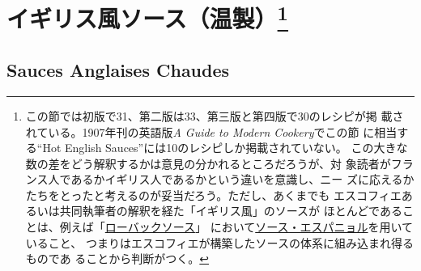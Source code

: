 \hypertarget{ux30a4ux30aeux30eaux30b9ux98a8ux30bdux30fcux30b9ux6e29ux88fd24}{%
\section[イギリス風ソース（温製）]{\texorpdfstring{イギリス風ソース（温製）\footnote{この節では初版で31、第二版は33、第三版と第四版で30のレシピが掲
  載されている。1907年刊の英語版\emph{A Guide to Modern Cookery}でこの節
  に相当する``Hot English Sauces''には10のレシピしか掲載されていない。
  この大きな数の差をどう解釈するかは意見の分かれるところだろうが、対
  象読者がフランス人であるかイギリス人であるかという違いを意識し、ニー
  ズに応えるかたちをとったと考えるのが妥当だろう。ただし、あくまでも
  エスコフィエあるいは共同執筆者の解釈を経た「イギリス風」のソースが
  ほとんどであることは、例えば「\protect\hyperlink{roe-buck-sauce}{ローバックソース}」
  において\protect\hyperlink{sauce-espagnole}{ソース・エスパニョル}を用いていること、
  つまりはエスコフィエが構築したソースの体系に組み込まれ得るものであ
  ることから判断がつく。}}{イギリス風ソース（温製）}}\label{ux30a4ux30aeux30eaux30b9ux98a8ux30bdux30fcux30b9ux6e29ux88fd24}}

\hypertarget{sauces-anglaises-chaudes}{%
\subsection{Sauces Anglaises Chaudes}\label{sauces-anglaises-chaudes}}

